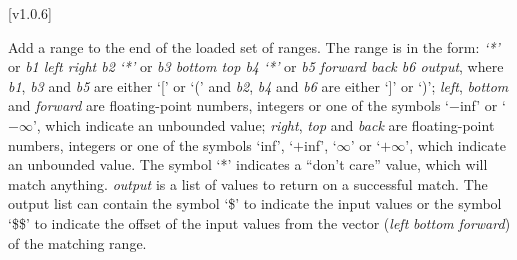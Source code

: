 [v1.0.6]






\objItemArgs{\ }

  \objListArgBegin
  \objListArgEnd

\objItemInlet{\ }

  \objListIOBegin
  \objListIOEnd

\objItemOutlet{\ }

  \objListIOBegin
  \objListIOEnd






\objItemCommands[]

  \objListCmdBegin

  Add a range to the end of the loaded set of ranges.
  The range is in the form: \emph{`*'} or \emph{b1 left right b2} \emph{`*'} or \emph{b3 bottom top b4} \emph{`*'} or \emph{b5 forward back b6 output}, where
  \emph{b1}, \emph{b3} and \emph{b5} are either `[' or `(' and \emph{b2}, \emph{b4} and \emph{b6} are
  either `]' or `)';
  \emph{left}, \emph{bottom} and \emph{forward} are floating-point numbers, integers or one of the symbols `$-$inf' or
  `$-\infty$', which indicate an unbounded value;
  \emph{right}, \emph{top} and \emph{back} are floating-point numbers, integers or one of the symbols `inf', `$+$inf',
  `$\infty$' or `$+\infty$', which indicate an unbounded value.
  The symbol `*' indicates a ``don't care'' value, which will match anything.
  \emph{output} is a list of values to return on a successful match.
  The output list can contain the symbol `\$' to indicate the input values or the symbol `\$\$' to
  indicate the offset of the input values from the vector (\emph{left} \emph{bottom} \emph{forward}) of the
  matching range.
  
